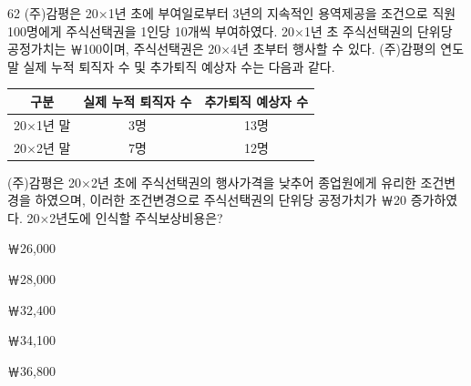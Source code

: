 \begin{question}{62}
(주)감평은 20×1년 초에 부여일로부터 3년의 지속적인 용역제공을 조건으로 직원 100명에게 주식선택권을 1인당 10개씩 부여하였다. 20×1년 초 주식선택권의 단위당 공정가치는 ￦100이며, 주식선택권은 20×4년 초부터 행사할 수 있다. (주)감평의 연도 말 실제 누적 퇴직자 수 및 추가퇴직 예상자 수는 다음과 같다.
\par
{\small\centering
\begin{tabular}{|c|c|c|}\hline
구분 & 실제 누적 퇴직자 수 & 추가퇴직 예상자 수 \\\hline
20×1년 말 & 3명 & 13명 \\\hline
20×2년 말 & 7명 & 12명 \\\hline
\end{tabular}\par}
(주)감평은 20×2년 초에 주식선택권의 행사가격을 낮추어 종업원에게 유리한 조건변경을 하였으며, 이러한 조건변경으로 주식선택권의 단위당 공정가치가 ￦20 증가하였다. 20×2년도에 인식할 주식보상비용은? \par
\begin{choices}
  \item ￦26,000
  \item ￦28,000
  \item ￦32,400
  \item ￦34,100
  \item ￦36,800
\end{choices}
\end{question}
